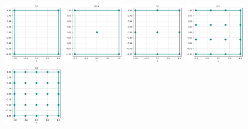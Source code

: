 \includegraphics[width=3cm]{python_codes/fieldstone_120/spaces/Q1_nodes}
\includegraphics[width=3cm]{python_codes/fieldstone_120/spaces/Q1+_nodes}
\includegraphics[width=3cm]{python_codes/fieldstone_120/spaces/Q2_nodes}
\includegraphics[width=3cm]{python_codes/fieldstone_120/spaces/Q3_nodes}
\includegraphics[width=3cm]{python_codes/fieldstone_120/spaces/Q4_nodes}

